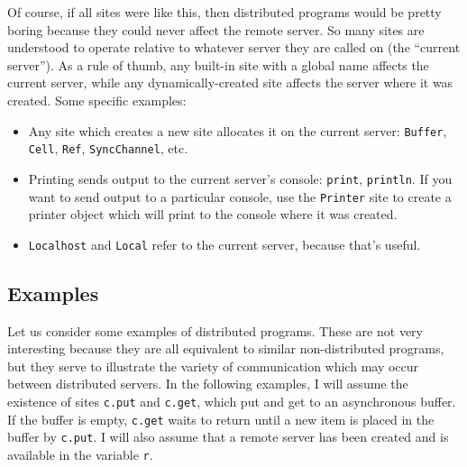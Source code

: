 \documentclass[10pt,letterpaper]{article}
\begin{document}
Of course, if all sites were like this, then distributed programs would be
pretty boring because they could never affect the remote server. So many sites
are understood to operate relative to whatever server they are called on (the
``current server''). As a rule of thumb, any built-in site with a global name
affects the current server, while any dynamically-created site affects the
server where it was created. Some specific examples:
\begin{itemize}
\item Any site which creates a new site allocates it on the current
server: \texttt{Buffer}, \texttt{Cell}, \texttt{Ref}, \texttt{SyncChannel}, etc.
\item Printing sends output to the current server's console: \texttt{print},
\texttt{println}. If you want to send output to a particular console, use the
\texttt{Printer} site to create a printer object which will print to the
console where it was created.
\item \texttt{Localhost} and \texttt{Local} refer to the current server, because that's useful.
\end{itemize}

\subsection{Examples}

Let us consider some examples of distributed programs. These are not very
interesting because they are all equivalent to similar non-distributed
programs, but they serve to illustrate the variety of communication which may
occur between distributed servers.  In the following examples, I will assume
the existence of sites \texttt{c.put} and \texttt{c.get}, which put and get to
an asynchronous buffer. If the buffer is empty, \texttt{c.get} waits to return
until a new item is placed in the buffer by \texttt{c.put}. I will also assume
that a remote server has been created and is available in the variable
\texttt{r}.
\end{document}
